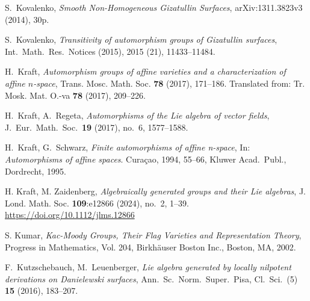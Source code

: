 S.~Kovalenko,
 \emph{Smooth Non-Homogeneous Gizatullin Surfaces}, arXiv:1311.3823v3 (2014), 30p.

S.~Kovalenko,
 \emph{Transitivity of automorphism groups of Gizatullin surfaces},
 Int.\ Math.\ Res.\ Notices (2015), 2015 (21), 11433--11484.


H.~Kraft,
\emph{Automorphism groups of affine varieties
and a characterization of affine $n$-space},
Trans. Mosc. Math. Soc. \textbf{78} (2017), 171--186.
Translated from: Tr. Mosk. Mat. O.-va \textbf{78} (2017), 209--226.

H.~Kraft, A.~Regeta, \emph{Automorphisms of the Lie algebra of vector fields},
J.\ Eur.\ Math.\ Soc.\ \textbf{19} (2017), no.~6, 1577--1588.

H.~Kraft, G.~Schwarz,  \emph{Finite
automorphisms of affine n-space},
In: \emph{Automorphisms of affine spaces}. Cura\c cao,
1994, 55--66, Kluwer Acad.\ Publ., Dordrecht, 1995.

H. Kraft, M. Zaidenberg, \emph{Algebraically generated groups and their Lie algebras}, J. Lond. Math. Soc. \textbf{109}:e12866 (2024), no.~2, 1--39. \url{https://doi.org/10.1112/jlms.12866}


S. Kumar, \emph{Kac-Moody Groups, Their Flag Varieties and Representation Theory},
   Progress in Mathematics, Vol. 204, Birkh\"auser Boston Inc., Boston, MA, 2002.

F.~Kutzschebauch, M.~Leuenberger,
\emph{
Lie algebra generated by locally nilpotent derivations on Danielewski surfaces}, Ann.\ Sc.\ Norm.\ Super.\ Pisa, Cl.\ Sci.\ (5) \textbf{15} (2016), 183--207.


